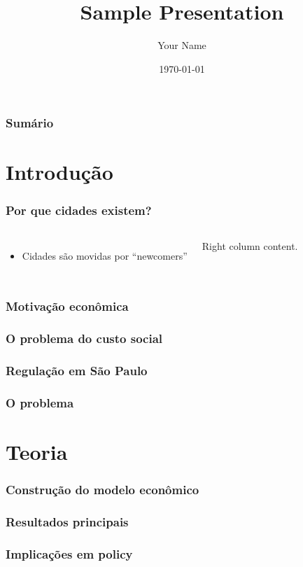 \documentclass[aspectratio=169]{beamer}
\title{Sample Presentation}
\author{Your Name}
\date{\today}
\begin{document}
\frame{\titlepage}

\begin{frame}
\frametitle{Sumário}
\tableofcontents
\end{frame}

\section{Introdução}

\begin{frame}
    \frametitle{Por que cidades existem?}

    \begin{columns}
        \begin{itemize}
            \item Cidades são movidas por ``newcomers'' \cite{bauman2003city}
        \end{itemize}

        Right column content.
    \end{columns}
\end{frame}

\begin{frame}
    \frametitle{Motivação econômica}
\end{frame}


\begin{frame}
    \frametitle{O problema do custo social}
\end{frame}

\begin{frame}
    \frametitle{Regulação em São Paulo}
\end{frame}

\begin{frame}
    \frametitle{O problema}
\end{frame}

\section{Teoria}

\begin{frame}
    \frametitle{Construção do modelo econômico}
\end{frame}

\begin{frame}
    \frametitle{Resultados principais}
\end{frame}

\begin{frame}
    \frametitle{Implicações em policy}
\end{frame}
\end{document}
